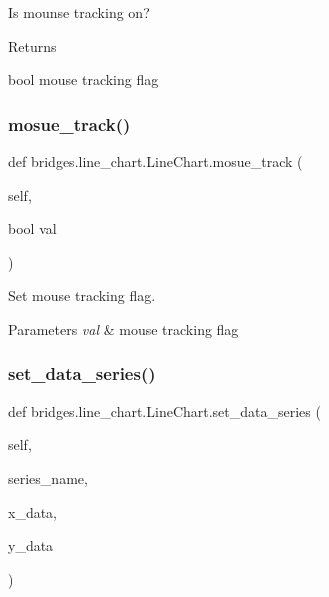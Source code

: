 Is mounse tracking on? 

\begin{DoxyReturn}{Returns}


bool mouse tracking flag 
\end{DoxyReturn}
\mbox{\label{classbridges_1_1line__chart_1_1_line_chart_aadf9c7d6cc6b281e64563356fbe84ef8}} 
\subsubsection{\texorpdfstring{mosue\_track()}{mosue\_track()}\hspace{0.1cm}{\footnotesize\ttfamily [2/2]}}
{\footnotesize\ttfamily def bridges.\+line\+\_\+chart.\+Line\+Chart.\+mosue\+\_\+track (\begin{DoxyParamCaption}\item[{}]{self,  }\item[{bool}]{val }\end{DoxyParamCaption})}



Set mouse tracking flag. 


\begin{DoxyParams}{Parameters}
{\em val} & mouse tracking flag \\
\hline
\end{DoxyParams}
\mbox{\label{classbridges_1_1line__chart_1_1_line_chart_a989930527e9981b9d12cb0b56aefba76}} 
\subsubsection{\texorpdfstring{set\_data\_series()}{set\_data\_series()}}
{\footnotesize\ttfamily def bridges.\+line\+\_\+chart.\+Line\+Chart.\+set\+\_\+data\+\_\+series (\begin{DoxyParamCaption}\item[{}]{self,  }\item[{}]{series\+\_\+name,  }\item[{}]{x\+\_\+data,  }\item[{}]{y\+\_\+data }\end{DoxyParamCaption})}



